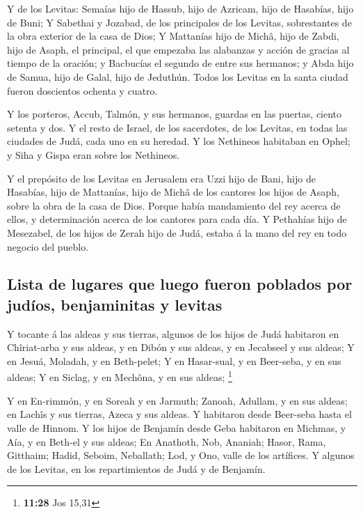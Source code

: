  Y de los Levitas: Semaías hijo de Hassub, hijo de Azricam,
hijo de Hasabías, hijo de Buni;  Y Sabethai y Jozabad, de
los principales de los Levitas, sobrestantes de la obra exterior de la
casa de Dios;  Y Mattanías hijo de Michâ, hijo de Zabdi,
hijo de Asaph, el principal, el que empezaba las alabanzas y acción de
gracias al tiempo de la oración; y Bacbucías el segundo de entre sus
hermanos; y Abda hijo de Samua, hijo de Galal, hijo de Jeduthún.
 Todos los Levitas en la santa ciudad fueron doscientos
ochenta y cuatro.

 Y los porteros, Accub, Talmón, y sus hermanos, guardas en
las puertas, ciento setenta y dos.  Y el resto de Israel,
de los sacerdotes, de los Levitas, en todas las ciudades de Judá, cada
uno en su heredad.  Y los Nethineos habitaban en Ophel; y
Siha y Gispa eran sobre los Nethineos.

 Y el prepósito de los Levitas en Jerusalem era Uzzi hijo
de Bani, hijo de Hasabías, hijo de Mattanías, hijo de Michâ de los
cantores los hijos de Asaph, sobre la obra de la casa de Dios.
 Porque había mandamiento del rey acerca de ellos, y
determinación acerca de los cantores para cada día.  Y
Pethahías hijo de Mesezabel, de los hijos de Zerah hijo de Judá, estaba
á la mano del rey en todo negocio del pueblo.

\hypertarget{lista-de-lugares-que-luego-fueron-poblados-por-juduxedos-benjaminitas-y-levitas}{%
\subsection{Lista de lugares que luego fueron poblados por judíos,
benjaminitas y
levitas}\label{lista-de-lugares-que-luego-fueron-poblados-por-juduxedos-benjaminitas-y-levitas}}

 Y tocante á las aldeas y sus tierras, algunos de los hijos
de Judá habitaron en Chîriat-arba y sus aldeas, y en Dibón y sus aldeas,
y en Jecabseel y sus aldeas;  Y en Jesuá, Moladah, y en
Beth-pelet;  Y en Hasar-sual, y en Beer-seba, y en sus
aldeas;  Y en Siclag, y en Mechôna, y en sus aldeas;
\footnote{\textbf{11:28} Jos 15,31}

 Y en En-rimmón, y en Soreah y en Jarmuth; 
Zanoah, Adullam, y en sus aldeas; en Lachîs y sus tierras, Azeca y sus
aldeas. Y habitaron desde Beer-seba hasta el valle de Hinnom.
 Y los hijos de Benjamín desde Geba habitaron en Michmas, y
Aía, y en Beth-el y sus aldeas;  En Anathoth, Nob, Ananiah;
 Hasor, Rama, Gitthaim;  Hadid, Seboim,
Neballath;  Lod, y Ono, valle de los artífices.
 Y algunos de los Levitas, en los repartimientos de Judá y
de Benjamín.


